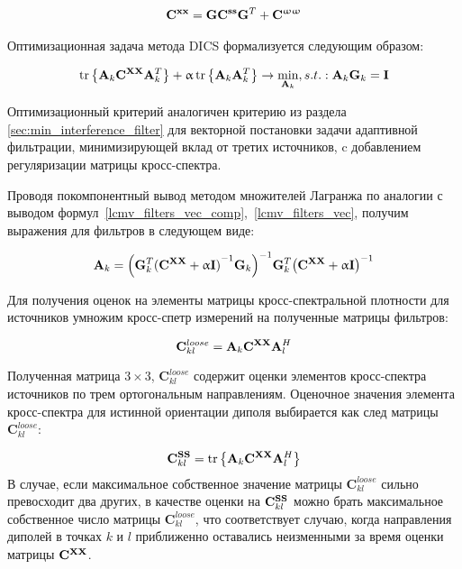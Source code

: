 \begin{gather}
    \mathbf{C}^{\mathbf{x x}} = \mathbf{G} \mathbf{C}^{\mathbf{s s}} \mathbf{G}^T + \mathbf{C}^{\mathbf{\upomega \upomega}}
    \label{gm_cp_matr}
\end{gather}

Оптимизационная задача метода DICS формализуется следующим образом:

\begin{equation}
    \operatorname{tr}\left\{\mathbf{A}_k \mathbf{C}^{\mathbf{X X}} \mathbf{A}_k^T\right\} +
     \upalpha \operatorname{tr}\left\{\mathbf{A}_k \mathbf{A}_k^T\right\}
    \rightarrow \underset{\mathbf{A}_k}{\min}
    , s.t.: \mathbf{A}_k \mathbf{G}_k = \mathbf{I}
\end{equation}

Оптимизационный критерий аналогичен критерию из раздела \ref{sec:min_interference_filter}
для векторной постановки задачи адаптивной фильтрации,
минимизирующей вклад от третих источников, c добавлением регуляризации матрицы кросс-спектра.

Проводя покомпонентный вывод методом множителей Лагранжа по аналогии с
выводом формул~\ref{lcmv_filters_vec_comp},~\ref{lcmv_filters_vec}, получим
выражения для фильтров в следующем виде:

\begin{equation}
    \mathbf{A}_k =
    {\left(\mathbf{G}_k^T {(\mathbf{C}^{\mathbf{X X}} + \upalpha \mathbf{I})}^{-1} \mathbf{G}_k\right)}^{-1}
    \mathbf{G}_k^T {\left(\mathbf{C}^{\mathbf{X X}} + \upalpha \mathbf{I}\right)}^{-1}
\end{equation}

Для получения оценок на элементы матрицы кросс-спектральной плотности для источников
умножим кросс-спетр измерений на полученные матрицы фильтров:

\begin{equation}
    \mathbf{C}^{loose}_{kl} = \mathbf{A}_k \mathbf{C}^{\mathbf{X X}} \mathbf{A}_l^H
    \label{eq:dics_c_loose}
\end{equation}

Полученная матрица $3\times 3$, $\mathbf{C}^{loose}_{kl}$
содержит оценки элементов кросс-спектра источников по трем ортогональным направлениям.
Оценочное значения элемента кросс-спектра для истинной ориентации диполя
выбирается как след матрицы $\mathbf{C}^{loose}_{kl}$:

\begin{equation}
    \mathbf{C}^{\mathbf{S S}}_{kl} = \operatorname{tr}\left\{\mathbf{A}_k \mathbf{C}^{\mathbf{X X}} \mathbf{A}_l^H\right\}
\end{equation}
В случае, если максимальное собственное значение матрицы $\mathbf{C}^{loose}_{kl}$
сильно превосходит два других, в качестве оценки на $\mathbf{C}^{\mathbf{S S}}_{kl}$ можно брать
максимальное собственное число матрицы $\mathbf{C}^{loose}_{kl}$, что соответствует
случаю, когда направления диполей в точках $k$ и $l$ приближенно оставались неизменными
за время оценки матрицы $\mathbf{C}^{\mathbf{X X}}$.

